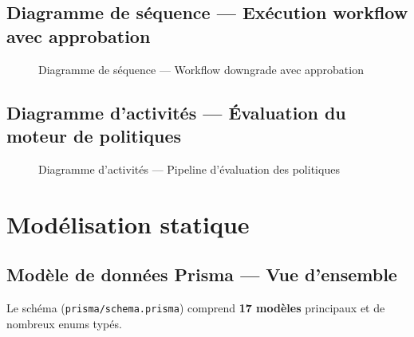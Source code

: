 \subsection{Diagramme de séquence — Exécution workflow avec approbation}

\begin{figure}[H]
\centering
{}
\caption{Diagramme de séquence — Workflow downgrade avec approbation}
\label{fig:seq_workflow}
\end{figure}

\subsection{Diagramme d'activités — Évaluation du moteur de politiques}

\begin{figure}[H]
\centering
{}
\caption{Diagramme d'activités — Pipeline d'évaluation des politiques}
\label{fig:act_policy}
\end{figure}

\section{Modélisation statique}

\subsection{Modèle de données Prisma — Vue d'ensemble}

Le schéma (\texttt{prisma/schema.prisma}) comprend \textbf{17 modèles}
principaux et de nombreux enums typés.

